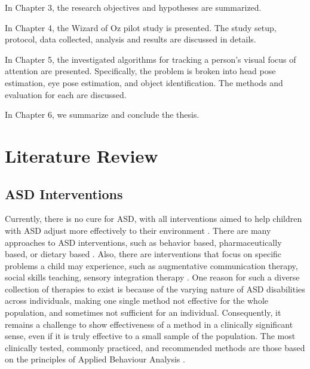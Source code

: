 \documentclass{ut-thesis}
\begin{document}
In Chapter 3, the research objectives and hypotheses are summarized.

In Chapter 4, the Wizard of Oz pilot study is presented.  The study setup, protocol, data collected, analysis and results are discussed in details.

In Chapter 5, the investigated algorithms for tracking a person's visual focus of attention are presented.  Specifically, the problem is broken into head pose estimation, eye pose estimation, and object identification.  The methods and evaluation for each are discussed.

In Chapter 6, we summarize and conclude the thesis.




\chapter{Literature Review}

\section{ASD Interventions}

Currently, there is no cure for ASD, with all interventions aimed to help children with ASD adjust more effectively to their environment \cite{francis2005autism}.  There are many approaches to ASD interventions, such as behavior based, pharmaceutically based, or dietary based \cite{francis2005autism}.  Also, there are interventions that focus on specific problems a child may experience, such as augmentative communication therapy, social skills teaching, sensory integration therapy \cite{francis2005autism}.  One reason for such a diverse collection of therapies to exist is because of the varying nature of ASD disabilities across individuals, making one single method not effective for the whole population, and sometimes not sufficient for an individual.  Consequently, it remains a challenge to show effectiveness of a method in a clinically significant sense, even if it is truly effective to a small sample of the population.  The most clinically tested, commonly practiced, and recommended methods are those based on the principles of Applied Behaviour Analysis \cite{foxx2008applied}.
\end{document}
